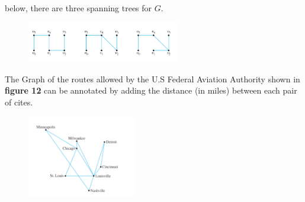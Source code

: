 \documentclass{report}
\begin{document}
below, there are three spanning trees for $G$.
\begin{figure}[ht]
\centering
\includegraphics[width=0.6\textwidth]{ treesolution.png }
\end{figure}
\bigbreak \noindent \bigbreak \noindent
{}
\bigbreak \noindent
The Graph of the routes allowed by the U.S Federal Aviation Authority shown in \textbf{figure {12}} can be annotated by adding the distance (in miles) between each pair of cites.
\begin{figure}[ht]
\centering
\includegraphics[width=0.42\textwidth]{ minspan.png }
\caption{}
\end{figure}
\pagebreak
\end{document}

